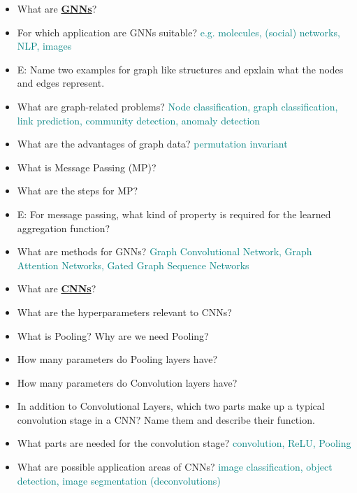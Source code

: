 \documentclass{report}
\newcommand{\asw}[2][teal]{}
\renewcommand{\asw}[2][teal]{\textcolor{#1}{#2}}
\begin{document}
\begin{itemize}
		\item What are \textbf{\underline{GNNs}}?
		\asw{\newline }
		\item For which application are GNNs suitable?
		\asw{\newline e.g. molecules, (social) networks, NLP, images}
		\item E: Name two examples for graph like structures and epxlain what the nodes and edges represent.
		\asw{\newline }
		\item What are graph-related problems?
		\asw{\newline Node classification, graph classification, link prediction, community detection, anomaly detection}
		\item What are the advantages of graph data?
		\asw{\newline permutation invariant}
		\item What is Message Passing (MP)?
		\asw{\newline }
		\item What are the steps for MP?
		\asw{\newline }
		\item E: For message passing, what kind of property is required for the learned aggregation function?
		\asw{\newline }
		\item What are methods for GNNs?
		\asw{\newline Graph Convolutional Network, Graph Attention Networks, Gated Graph Sequence Networks}
		
		\item What are \textbf{\underline{CNNs}}?
		\asw{\newline }
		\item What are the hyperparameters relevant to CNNs?
		\asw{\newline }
		\item What is Pooling? Why are we need Pooling?
		\asw{\newline }
		\item How many parameters do Pooling layers have?
		\asw{\newline }
		\item How many parameters do Convolution layers have?
		\asw{\newline }
		\item In addition to Convolutional Layers, which two parts make up a typical convolution stage in a CNN? Name them and describe their function.
		\asw{\newline }
		\item What parts are needed for the convolution stage?
		\asw{\newline convolution, ReLU, Pooling}
		\item What are possible application areas of CNNs?
		\asw{\newline image classification, object detection, image segmentation (deconvolutions)}
		

\end{itemize}
\end{document}

